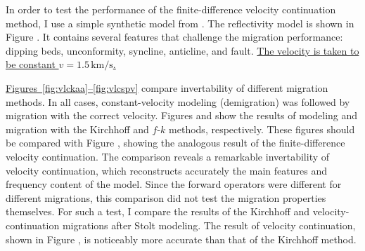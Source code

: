 \begin{comment}
The following simple ratfor program implements the finite-difference
velocity continuation. It is slightly modified from Jon Claerbout's
original version and has a more straightforward loop structure than
Zhiming Li's {\tt Caso15} program.
\listing{velcon.rt}
The parameter {\tt adj} controls the direction of propagation. It is
equal to zero for backward propagation, which corresponds to the
modeling (demigration) operator. The parameter {\tt inv} controls the
amplitude behavior by introducing time-dependent divisors to equation
\EQN{fds}. For {\tt inv=1}, the program implements
Claerbout's velocity continuation equation. For {\tt inv=2}, it
implements the modified equation \EQN{POMequation2}. The value of {\tt
inv=0} corresponds to the intermediate case. It leads to the
{\em pseudounitary} velocity continuation, for which the reverse
continuation is the exact adjoint operator
\cite{Fomel.sep.92.267}. We can easily test different types of
amplitude behavior with the dot-product test and its modifications.
The parameter {\tt b} is required for the ``1/6 trick'' introduced by
Claerbout \shortcite{Claerbout.blackwell.85} to increase the accuracy
of the second-derivative operator ${\bf T}$ in \EQN{fds}. The
second-order difference in subroutine {\tt diffxx} implies simple
zero-slope boundary conditions on the midpoint coordinate. The call to
{\tt rtris} solves the tridiagonal system.
\end{comment}

In order to test the performance of the finite-difference velocity
continuation method, I use a simple synthetic model from
. The reflectivity model is shown in
Figure . It contains several features that challenge the
migration performance: dipping beds, unconformity, syncline,
anticline, and fault. \uline{The velocity is taken to be constant 
$v=1.5\,\mbox{km/s}$.}


\uline{Figures~\ref{fig:vlckaa}--\ref{fig:vlcspv}} compare invertability of different
migration methods. In all cases, constant-velocity modeling (demigration) 
was followed by migration
with the correct velocity.  Figures  and  show the
results of modeling and migration with the Kirchhoff \cite{GEO43.01.00490076}
and $f$-$k$ \cite{GEO43.01.00230048} methods, respectively. These figures
should be compared with Figure , showing the analogous result of
the finite-difference velocity continuation.  The comparison reveals a
remarkable invertability of velocity continuation, which reconstructs
accurately the main features and frequency content of the model. Since the
forward operators were different for different migrations, this comparison did
not test the migration properties themselves. For such a test, I compare the
results of the Kirchhoff and velocity-continuation migrations after Stolt
modeling.  The result of velocity continuation, shown in Figure ,
is noticeably more accurate than that of the Kirchhoff method.

